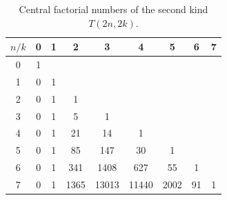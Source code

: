 \begin{table}[H]
  \begin{center}
    \setlength\extrarowheight{-6pt}
    \begin{tabular}{c|cccccccc}
      $n/k$ & 0 & 1 & 2 & 3 & 4 & 5 & 6 & 7 \\
      \hline
      0 & 1 &   &      &       &       &      &    &     \\
      1 & 0 & 1 &      &       &       &      &    &     \\
      2 & 0 & 1 & 1    &       &       &      &    &     \\
      3 & 0 & 1 & 5    & 1     &       &      &    &     \\
      4 & 0 & 1 & 21   & 14    & 1     &      &    &     \\
      5 & 0 & 1 & 85   & 147   & 30    & 1    &    &     \\
      6 & 0 & 1 & 341  & 1408  & 627   & 55   & 1  &     \\
      7 & 0 & 1 & 1365 & 13013 & 11440 & 2002 & 91 & 1   \\
    \end{tabular}
  \end{center}
  \caption{Central factorial numbers of the second kind $T(2n,2k)$.}
  \label{tab:central-factorial-numbers-t0-even}
\end{table}
